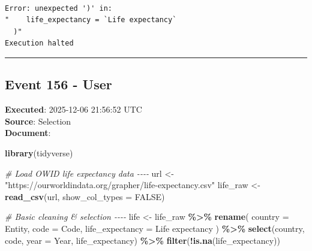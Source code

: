 \documentclass[
  11pt,
]{article}
\newenvironment{Shaded}{\begin{snugshade}}{\end{snugshade}}
\newcommand{\AttributeTok}[1]{\textcolor[rgb]{0.13,0.29,0.53}{#1}}
\newcommand{\CommentTok}[1]{\textcolor[rgb]{0.56,0.35,0.01}{\textit{#1}}}
\newcommand{\ConstantTok}[1]{\textcolor[rgb]{0.56,0.35,0.01}{#1}}
\newcommand{\FunctionTok}[1]{\textcolor[rgb]{0.13,0.29,0.53}{\textbf{#1}}}
\newcommand{\NormalTok}[1]{#1}
\newcommand{\OtherTok}[1]{\textcolor[rgb]{0.56,0.35,0.01}{#1}}
\newcommand{\SpecialCharTok}[1]{\textcolor[rgb]{0.81,0.36,0.00}{\textbf{#1}}}
\newcommand{\StringTok}[1]{\textcolor[rgb]{0.31,0.60,0.02}{#1}}
\newenvironment{rpoutput}{\vspace{0.5em}\begin{snugshade}}{\end{snugshade}}
\begin{document}
\begin{rpoutput}

\begin{verbatim}

Error: unexpected ')' in:
"    life_expectancy = `Life expectancy`
  )"
Execution halted
\end{verbatim}

\end{rpoutput}

\begin{center}\rule{0.5\linewidth}{0.5pt}\end{center}

\subsection{Event 156 - User}\label{event-156---user}

\textbf{Executed}: 2025-12-06 21:56:52 UTC\\
\textbf{Source}: Selection\\
\textbf{Document}:

\begin{Shaded}
\begin{Highlighting}[]
\FunctionTok{library}\NormalTok{(tidyverse)}

\CommentTok{\# Load OWID life expectancy data {-}{-}{-}{-}}
\NormalTok{url }\OtherTok{\textless{}{-}} \StringTok{"https://ourworldindata.org/grapher/life{-}expectancy.csv"}
\NormalTok{life\_raw }\OtherTok{\textless{}{-}} \FunctionTok{read\_csv}\NormalTok{(url, }\AttributeTok{show\_col\_types =} \ConstantTok{FALSE}\NormalTok{)}

\CommentTok{\# Basic cleaning \& selection {-}{-}{-}{-}}
\NormalTok{life }\OtherTok{\textless{}{-}}\NormalTok{ life\_raw }\SpecialCharTok{\%\textgreater{}\%}
  \FunctionTok{rename}\NormalTok{(}
    \AttributeTok{country =}\NormalTok{ Entity,}
    \AttributeTok{code =}\NormalTok{ Code,}
    \AttributeTok{life\_expectancy =} \StringTok{\textasciigrave{}}\AttributeTok{Life expectancy}\StringTok{\textasciigrave{}}
\NormalTok{  ) }\SpecialCharTok{\%\textgreater{}\%}
  \FunctionTok{select}\NormalTok{(country, code, }\AttributeTok{year =}\NormalTok{ Year, life\_expectancy) }\SpecialCharTok{\%\textgreater{}\%}
  \FunctionTok{filter}\NormalTok{(}\SpecialCharTok{!}\FunctionTok{is.na}\NormalTok{(life\_expectancy))}
\end{Highlighting}
\end{Shaded}
\end{document}
